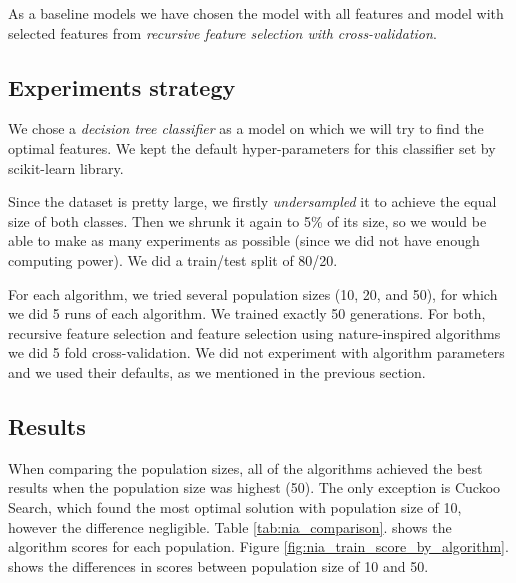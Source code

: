 \documentclass[runningheads]{llncs}
\begin{document}
As a baseline models we have chosen the model with all features and model with selected features from \textit{recursive feature selection with cross-validation}.

\subsection{Experiments strategy}

We chose a \textit{decision tree classifier} as a model on which we will try to find the optimal features. We kept the default hyper-parameters for this classifier set by scikit-learn library.

Since the dataset is pretty large, we firstly \textit{undersampled} it to achieve the equal size of both classes. Then we shrunk it again to 5\% of its size, so we would be able to make as many experiments as possible (since we did not have enough computing power). We did a train/test split of 80/20.

For each algorithm, we tried several population sizes (10, 20, and 50), for which we did 5 runs of each algorithm. We trained exactly 50 generations. For both, recursive feature selection and feature selection using nature-inspired algorithms we did 5 fold cross-validation. We did not experiment with algorithm parameters and we used their defaults, as we mentioned in the previous section.

\subsection{Results}

When comparing the population sizes, all of the algorithms achieved the best results when the population size was highest (50). The only exception is Cuckoo Search, which found the most optimal solution with population size of 10, however the difference negligible. Table \ref{tab:nia_comparison}. shows the algorithm scores for each population. Figure \ref{fig:nia_train_score_by_algorithm}. shows the differences in scores between population size of 10 and 50.
\end{document}
